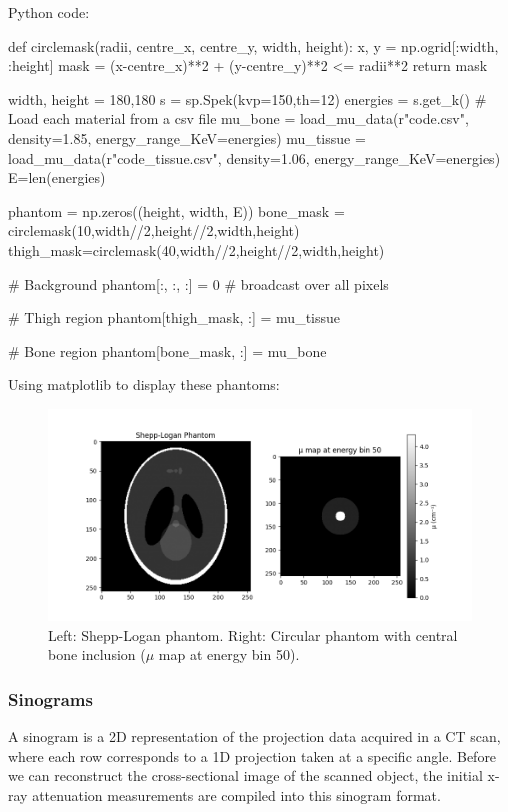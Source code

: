 \documentclass{article}
\theoremstyle{definition}
\begin{document}
Python code:\\

\begin{python}
def circlemask(radii, centre_x, centre_y, width, height):
    x, y = np.ogrid[:width, :height]
    mask = (x-centre_x)**2 + (y-centre_y)**2 <= radii**2
    return mask
   
width, height = 180,180
s = sp.Spek(kvp=150,th=12)
energies = s.get_k()
# Load each material from a csv file
mu_bone = load_mu_data(r"code\bone.csv", density=1.85, energy_range_KeV=energies)
mu_tissue = load_mu_data(r"code\soft_tissue.csv", density=1.06, energy_range_KeV=energies)
E=len(energies)

phantom = np.zeros((height, width, E))
bone_mask = circlemask(10,width//2,height//2,width,height)
thigh_mask=circlemask(40,width//2,height//2,width,height)

# Background
phantom[:, :, :] = 0  # broadcast over all pixels

# Thigh region
phantom[thigh_mask, :] = mu_tissue

# Bone region
phantom[bone_mask, :] = mu_bone
\end{python}

Using matplotlib to display these phantoms:

\begin{figure}[H]
	\includegraphics[width=\linewidth]{simplephantom.png}
	\caption{Left: Shepp-Logan phantom. Right: Circular phantom with central bone inclusion ($\mu$ map at energy bin 50).}
	\label{fig:phantoms}
\end{figure}

\subsubsection{Sinograms}
A sinogram is a 2D representation of the projection data acquired in a CT scan, where each row corresponds to a 1D projection taken at a specific angle. Before we can reconstruct the cross-sectional image of the scanned object, the initial x-ray attenuation measurements are compiled into this sinogram format.
\end{document}
